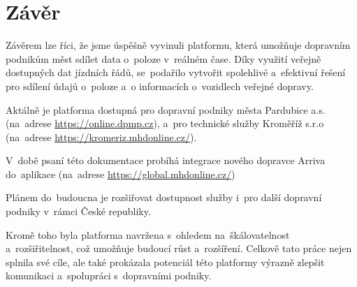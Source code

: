 \chapter{Závěr}
Závěrem lze říci, že jsme úspěšně vyvinuli platformu, která umožňuje dopravním podnikům měst sdílet data o~poloze v~reálném čase. Díky využití veřejně dostupných dat jízdních řádů, se~podařilo vytvořit spolehlivé a~efektivní řešení pro sdílení údajů o~poloze a~o informacích o~vozidlech veřejné dopravy.\par
Aktálně je platforma dostupná pro dopravní podniky města Pardubice a.s. (na~adrese \href{https://online.dpmp.cz}{https://online.dpmp.cz}), a~pro technické služby Kroměříž s.r.o \\ (na~adrese \href{https://kromeriz.mhdonline.cz/}{https://kromeriz.mhdonline.cz/}).

V~době psaní této dokumentace probíhá integrace nového dopravce Arriva do~aplikace (na~adrese \href{https://global.mhdonline.cz/}{https://global.mhdonline.cz/})

Plánem do~budoucna je rozšiřovat dostupnost služby i~pro další dopravní podniky v~rámci České republiky.\par
Kromě toho byla platforma navržena s~ohledem na~škálovatelnost a~rozšiřitelnost, což umožňuje budoucí růst a~rozšíření. Celkově tato práce nejen splnila své cíle, ale také prokázala potenciál této platformy výrazně zlepšit komunikaci a~spolupráci s~dopravními podniky.
